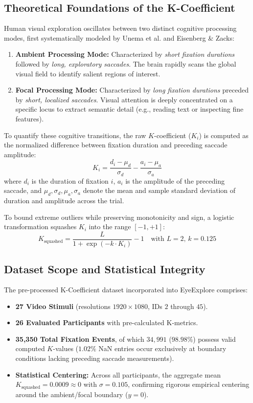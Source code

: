 \documentclass[11pt,a4paper]{article}
\begin{document}
\subsection{Theoretical Foundations of the K-Coefficient}
Human visual exploration oscillates between two distinct cognitive processing modes, first systematically modeled by Unema et al. and Eisenberg \& Zacks:
\begin{enumerate}[noitemsep,topsep=2pt]
    \item \textbf{Ambient Processing Mode:} Characterized by \textit{short fixation durations} followed by \textit{long, exploratory saccades}. The brain rapidly scans the global visual field to identify salient regions of interest.
    \item \textbf{Focal Processing Mode:} Characterized by \textit{long fixation durations} preceded by \textit{short, localized saccades}. Visual attention is deeply concentrated on a specific locus to extract semantic detail (e.g., reading text or inspecting fine features).
\end{enumerate}

To quantify these cognitive transitions, the raw $K$-coefficient ($K_i$) is computed as the normalized difference between fixation duration and preceding saccade amplitude:
\begin{equation}
    K_i = \frac{d_i - \mu_d}{\sigma_d} - \frac{a_i - \mu_a}{\sigma_a}
\end{equation}
where $d_i$ is the duration of fixation $i$, $a_i$ is the amplitude of the preceding saccade, and $\mu_d, \sigma_d, \mu_a, \sigma_a$ denote the mean and sample standard deviation of duration and amplitude across the trial.

To bound extreme outliers while preserving monotonicity and sign, a logistic transformation squashes $K_i$ into the range $[-1, +1]$:
\begin{equation}
    K_{\text{squashed}} = \frac{L}{1 + \exp(-k \cdot K_i)} - 1 \quad \text{with } L = 2, \, k = 0.125
\end{equation}

\subsection{Dataset Scope and Statistical Integrity}
The pre-processed K-Coefficient dataset incorporated into EyeExplore comprises:
\begin{itemize}[noitemsep,topsep=2pt]
    \item \textbf{27 Video Stimuli} (resolutions $1920 \times 1080$, IDs $2$ through $45$).
    \item \textbf{26 Evaluated Participants} with pre-calculated K-metrics.
    \item \textbf{35,350 Total Fixation Events}, of which $34,991$ ($98.98\%$) possess valid computed $K$-values ($1.02\%$ NaN entries occur exclusively at boundary conditions lacking preceding saccade measurements).
    \item \textbf{Statistical Centering:} Across all participants, the aggregate mean $K_{\text{squashed}} = 0.0009 \approx 0$ with $\sigma = 0.105$, confirming rigorous empirical centering around the ambient/focal boundary ($y = 0$).
\end{itemize}
\end{document}
